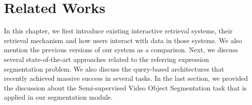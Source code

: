 \chapter{Related Works}
\label{chap-related-works}
\begin{ChapAbstract}
In this chapter, we first introduce existing interactive retrieval systems, their retrieval mechanism and how users interact with data in those systems.
We also mention the previous versions of our system as a comparison.
Next, we discuss several state-of-the-art approaches related to the referring expression segmentation problem. 
We also discuss the query-based architectures that recently achieved massive success in several tasks. 
In the last section, we provided the discussion about the Semi-supervised Video Object Segmentation task that is applied in our segmentation module. 
\end{ChapAbstract}





